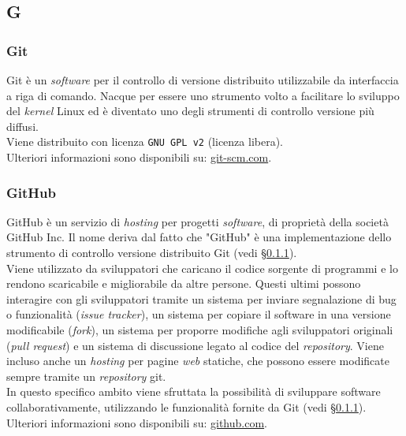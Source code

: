 \subsection{G}

\subsubsection{Git}
\label{git}
Git è un \textit{software} per il controllo di versione distribuito utilizzabile
da interfaccia a riga di comando.
Nacque per essere uno strumento volto a facilitare lo sviluppo del
\textit{kernel} Linux ed è diventato uno degli strumenti di controllo versione
più diffusi.\\
Viene distribuito con licenza \texttt{GNU GPL v2} (licenza libera). \\
Ulteriori informazioni sono disponibili su:
\href{https://git-scm.com/}{git-scm.com}.

\subsubsection{GitHub}
\label{github}
GitHub è un servizio di \textit{hosting} per progetti \textit{software}, di
proprietà della società GitHub Inc.
Il nome deriva dal fatto che "GitHub" è una implementazione dello strumento di
controllo versione distribuito Git (vedi \S\ref{git}). \\
Viene utilizzato da sviluppatori che caricano il codice sorgente di programmi e
lo rendono scaricabile e migliorabile da altre persone.
Questi ultimi possono interagire con gli sviluppatori tramite un sistema per
inviare segnalazione di bug o funzionalità (\textit{issue tracker}), un sistema
per copiare il software in una versione modificabile (\textit{fork}), un sistema
per proporre modifiche agli sviluppatori originali (\textit{pull request}) e un
sistema di discussione legato al codice del \textit{repository}.
Viene incluso anche un \textit{hosting} per pagine \textit{web} statiche, che
possono essere modificate sempre tramite un \textit{repository} git.\\
In questo specifico ambito viene sfruttata la possibilità di sviluppare software
collaborativamente, utilizzando le funzionalità fornite da
Git (vedi \S\ref{git}). \\
Ulteriori informazioni sono disponibili su:
\href{https://github.com/}{github.com}.

\newpage

